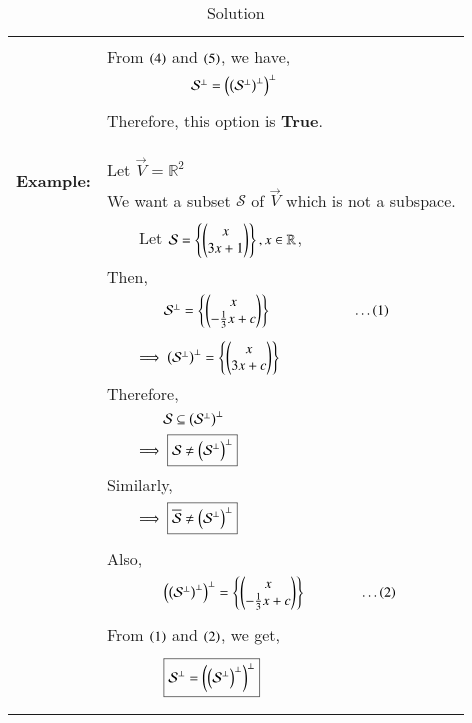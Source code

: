 \begin{longtable}{|c|l|}
	&\\
	&From $\left(4\right)$ and $\left(5\right)$, we have,\\
	&$\qquad\qquad\qquad\mathcal{S}^{\perp}=\left(\left(\mathcal{S}^{\perp}\right)^{\perp}\right)^{\perp}$\\
	&\\
	&Therefore, this option is \textbf{True}.\\
	&\\
	\hline
	&\\
	\multirow{3}{*}{\textbf{Example:}}
	&\\
	&Let $\Vec{V}=\mathbb{R}^2$\\
	&We want a subset $\mathcal{S}$ of $\vec{V}$ which is not a subspace.\\
	&\\
	&$\qquad$Let $\mathcal{S}=\left\{\begin{pmatrix}x\\3x+1\end{pmatrix}\right\}, x\in\mathbb{R}$,\\
	&Then,\\
	&$\qquad\qquad\mathcal{S}^{\perp}=\left\{\begin{pmatrix}x\\-\frac{1}{3}x+c\end{pmatrix}\right\}\qquad\qquad\qquad\dots\left(1\right)$\\
	&\\
	&$\qquad\implies\left(\mathcal{S}^{\perp}\right)^{\perp}=\left\{\begin{pmatrix}x\\3x+c\end{pmatrix}\right\}$\\
	&Therefore,\\
	&$\qquad\qquad\mathcal{S}\subseteq\left(\mathcal{S}^{\perp}\right)^{\perp}$\\
	&$\qquad\implies\boxed{\mathcal{S}\neq\left(\mathcal{S}^{\perp}\right)^{\perp}}$\\
	&Similarly,\\
	&$\qquad\implies\boxed{\overline{\mathcal{S}}\neq\left(\mathcal{S}^{\perp}\right)^{\perp}}$\\
	&\\
	&Also,\\
	&$\qquad\qquad\left(\left(\mathcal{S}^{\perp}\right)^{\perp}\right)^{\perp}=\left\{\begin{pmatrix}x\\-\frac{1}{3}x+c\end{pmatrix}\right\}\qquad\qquad\dots\left(2\right)$\\
	&\\
	&From $\left(1\right)$ and $\left(2\right)$, we get,\\
	&\\
	&$\qquad\qquad\boxed{\mathcal{S}^{\perp}=\left(\left(\mathcal{S}^{\perp}\right)^{\perp}\right)^{\perp}}$\\
	&\\
	\hline
	\caption{Solution}
    \label{eq:solutions/2018/june/76/table:2}
\end{longtable}
